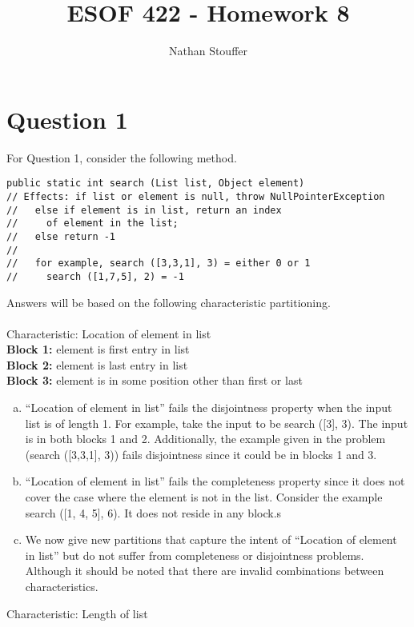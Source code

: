 \documentclass{article}
\begin{document}
\title{ESOF 422 - Homework 8}
\author{Nathan Stouffer}

\maketitle
\newpage
\section*{Question 1}

For Question 1, consider the following method.

\begin{verbatim}
public static int search (List list, Object element)
// Effects: if list or element is null, throw NullPointerException
//   else if element is in list, return an index
//     of element in the list;
//   else return -1
//   
//   for example, search ([3,3,1], 3) = either 0 or 1
//     search ([1,7,5], 2) = -1
\end{verbatim}
Answers will be based on the following characteristic partitioning. \\\\
Characteristic: Location of element in list \\
\indent \textbf{Block 1:} element is first entry in list \\
\indent \textbf{Block 2:} element is last entry in list \\
\indent \textbf{Block 3:} element is in some position other than first or last \\
\begin{enumerate}[(a)]
	\item ``Location of element in list'' fails the disjointness property when the input list is of length 1. For example, take the input to be search ([3], 3). The input is in both blocks 1 and 2. Additionally, the example given in the problem (search ([3,3,1], 3)) fails disjointness since it could be in blocks 1 and 3.
	\item ``Location of element in list'' fails the completeness property since it does not cover the case where the element is not in the list. Consider the example search ([1, 4, 5], 6). It does not reside in any block.s
	\item We now give new partitions that capture the intent of ``Location of element in list'' but do not suffer from completeness or disjointness problems. Although it should be noted that there are invalid combinations between characteristics.
\end{enumerate}
Characteristic: Length of list \\
\end{document}

